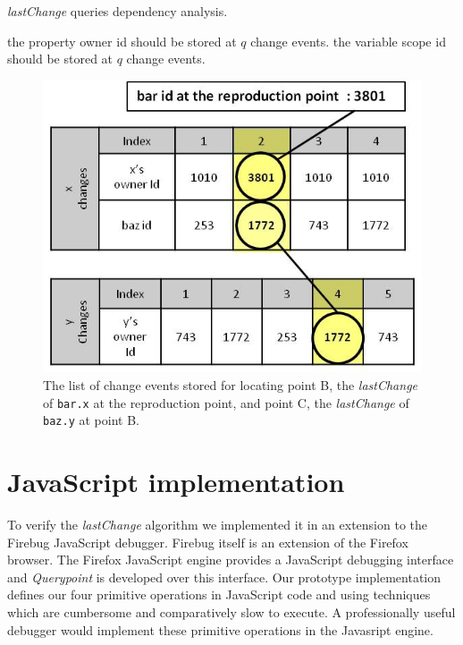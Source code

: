 \documentclass[runningheads,a4paper]{llncs}
\begin{document}
\begin{algorithm}
\caption{\textit{lastChange} queries dependency analysis.}
\label{dependency-analysis}
\begin{algorithmic}

     \STATE the property owner id should be stored at $q$ change events. 
     \STATE the variable scope id should be stored at $q$ change events.
	 \ENDIF 
 \ENDFOR 
\ENDFOR

\end{algorithmic}
\end{algorithm}

\begin{figure}[htp]
\includegraphics[width=.48\textwidth]{8-lastchange-lastchange.jpg}
\caption{The list of change events stored for locating point B, the
  \textit{lastChange} of \texttt{bar.x} at the reproduction point, and
  point C, the \textit{lastChange} of \texttt{baz.y} at point B.}
\label{fig:lastchange-lastchange}
\end{figure}



\section{JavaScript implementation}
To verify the \textit{lastChange} algorithm we
implemented it in an extension to the Firebug
JavaScript debugger\cite{Firebug}. %
Firebug itself is an extension of the Firefox browser\cite{Firefox}. %
The Firefox JavaScript engine provides a JavaScript debugging interface \cite{JSD} and 
\textit{Querypoint} is developed over this interface. Our prototype implementation defines our four primitive operations in JavaScript code and using techniques which are cumbersome and comparatively slow to execute.  A professionally useful debugger would implement these primitive operations in the Javasript engine.
\end{document}

